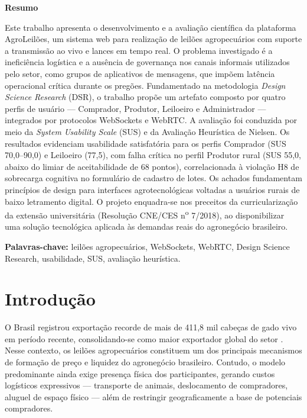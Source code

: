 \documentclass[12pt]{article}
\newenvironment{resumo}{%
  \vspace{1em}%
  {\centering\textbf{Resumo}\par}%
  \vspace{0.5em}%
  \small%
}{%
  \par\normalsize\vspace{1em}%
}
\begin{document}
\begin{resumo}
Este trabalho apresenta o desenvolvimento e a avaliação científica da plataforma
AgroLeilões, um sistema web para realização de leilões agropecuários com suporte a
transmissão ao vivo e lances em tempo real. O problema investigado é a ineficiência
logística e a ausência de governança nos canais informais utilizados pelo setor, como
grupos de aplicativos de mensagens, que impõem latência operacional crítica durante os
pregões. Fundamentado na metodologia \textit{Design Science Research} (DSR), o trabalho
propõe um artefato composto por quatro perfis de usuário --- Comprador, Produtor,
Leiloeiro e Administrador --- integrados por protocolos WebSockets e WebRTC. A avaliação foi conduzida por meio da \textit{System Usability Scale} (SUS) e da
Avaliação Heurística de Nielsen. Os resultados evidenciam usabilidade satisfatória para
os perfis Comprador (SUS 70,0--90,0) e Leiloeiro (77,5), com falha crítica no perfil
Produtor rural (SUS 55,0, abaixo do limiar de aceitabilidade de 68 pontos), correlacionada
à violação H8 de sobrecarga cognitiva no formulário de cadastro de lotes. Os achados
fundamentam princípios de design para interfaces agrotecnológicas voltadas a usuários
rurais de baixo letramento digital. O projeto enquadra-se nos preceitos da
curricularização da extensão universitária (Resolução CNE/CES
n\textsuperscript{o} 7/2018), ao disponibilizar uma solução tecnológica aplicada às
demandas reais do agronegócio brasileiro.

\textbf{Palavras-chave:} leilões agropecuários, WebSockets, WebRTC, Design Science
Research, usabilidade, SUS, avaliação heurística.
\end{resumo}

\section{Introdução}

O Brasil registrou exportação recorde de mais de 411,8 mil cabeças de gado vivo em
período recente, consolidando-se como maior exportador global do setor \cite{leilosul2024}.
Nesse contexto, os leilões agropecuários constituem um dos principais mecanismos de
formação de preço e liquidez do agronegócio brasileiro. Contudo, o modelo predominante
ainda exige presença física dos participantes, gerando custos logísticos expressivos ---
transporte de animais, deslocamento de compradores, aluguel de espaço físico --- além de
restringir geograficamente a base de potenciais compradores.
\end{document}
